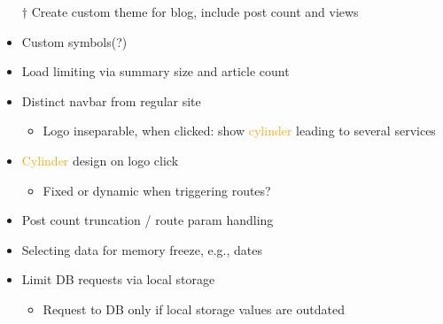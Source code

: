 \documentclass[7px]{article}
\begin{document}
{\begin{itemize}[label=\textsection]
\begin{itemize}[label=$\multimapdotinv$, leftmargin=3mm]
          \begin{itemize}[label=\wr, leftmargin=1.7mm]
            \item May use to obscure articles and release on specific time
          \end{itemize}
        \item[$\dag$] Create custom theme for blog, include post count and views
        \item Custom symbols(?)
        \item Load limiting via summary size and article count
        \item Distinct navbar from regular site
          \begin{itemize}[label=\wr, leftmargin=1.7mm]
            \item Logo inseparable, when clicked: show \textcolor{orange}{cylinder} leading to several services
          \end{itemize}
      \end{itemize}
  \end{itemize}
}
{
  \raggedright
  \begin{itemize}[label=\blitzb]
    \small
    \item \textcolor{orange}{Cylinder} design on logo click\:
      \begin{itemize}[label=$\multimapinv$]
        \item Fixed or dynamic when triggering routes?
      \end{itemize}
      \normalsize
    \item Post count truncation / route param handling
    \item Selecting data for memory freeze, e.g., dates
    \item Limit DB requests via local storage
      \begin{itemize}[label=$\multimapinv$]
        \item Request to DB only if local storage values are outdated
      \end{itemize}
  \end{itemize}
}

\deploy
{

}
{

}

\report
{

}
\end{document}
